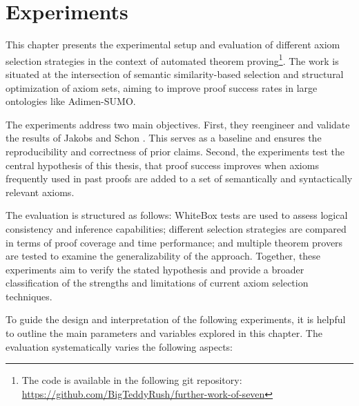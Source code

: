 \documentclass[english,version-2020-11]{uzl-thesis}
\begin{document}

\chapter{Experiments}
\label{chapter-experiments}

This chapter presents the experimental setup and evaluation of different axiom selection strategies in the context of automated theorem proving\footnote{The code is available in the following git repository: \url{https://github.com/BigTeddyRush/further-work-of-seven}}. The work is situated at the intersection of semantic similarity-based selection and structural optimization of axiom sets, aiming to improve proof success rates in large ontologies like Adimen-SUMO.

The experiments address two main objectives. First, they reengineer and validate the results of Jakobs and Schon \cite{Schon2024}. This serves as a baseline and ensures the reproducibility and correctness of prior claims. Second, the experiments test the central hypothesis of this thesis, that proof success improves when axioms frequently used in past proofs are added to a set of semantically and syntactically relevant axioms.

The evaluation is structured as follows: WhiteBox tests are used to assess logical consistency and inference capabilities; different selection strategies are compared in terms of proof coverage and time performance; and multiple theorem provers are tested to examine the generalizability of the approach. Together, these experiments aim to verify the stated hypothesis and provide a broader classification of the strengths and limitations of current axiom selection techniques.

To guide the design and interpretation of the following experiments, it is helpful to outline the main parameters and variables explored in this chapter. The evaluation systematically varies the following aspects:
\end{document}

